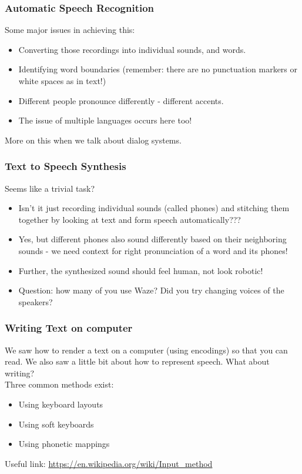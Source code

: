 \documentclass{beamer}
\begin{document}
\begin{frame}
\frametitle{Automatic Speech Recognition}
Some major issues in achieving this: 
\begin{itemize}
\item Converting those recordings into individual sounds, and words.
\item Identifying word boundaries (remember: there are no punctuation markers or white spaces as in text!)
\item Different people pronounce differently - different accents.
\item The issue of multiple languages occurs here too!
\end{itemize}
More on this when we talk about dialog systems. 
\end{frame}


\begin{frame}
\frametitle{Text to Speech Synthesis}
Seems like a trivial task?
\begin{itemize}
\item Isn't it just recording individual sounds (called phones) and stitching them together by looking at text and form speech automatically??? \pause
\item Yes, but different phones also sound differently based on their neighboring sounds - we need context for right pronunciation of a word and its phones! \pause
\item Further, the synthesized sound should feel human, not look robotic! 
\item Question: how many of you use Waze? Did you try changing voices of the speakers?
\end{itemize}
\end{frame}

\begin{frame}
\frametitle{Writing Text on computer}
We saw how to render a text on a computer (using encodings) so that you can read. We also saw a little bit about how to represent speech. What about writing?
\pause \\ Three common methods exist: 
\begin{itemize}
\item Using keyboard layouts
\item Using soft keyboards
\item Using phonetic mappings
\end{itemize}
Useful link: \url{https://en.wikipedia.org/wiki/Input_method}
\end{frame}
\end{document}

